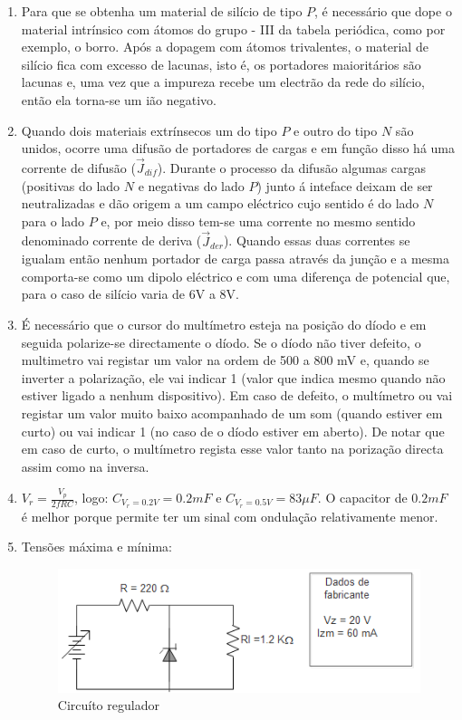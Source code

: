 \documentclass[11pt,a4paper,twoside]{report}
\begin{document}
\begin{enumerate}
\item Para que se obtenha um material de sil\'icio de tipo $P$, \'e necess\'ario que dope o material intr\'insico com \'atomos do grupo - III da tabela peri\'odica, como por exemplo, o borro. Ap\'os a dopagem com \'atomos trivalentes, o material de sil\'icio fica com excesso de lacunas, isto \'e, os portadores maiorit\'arios s\~ao lacunas e, uma vez que a impureza recebe um electr\~ao da rede do sil\'icio, ent\~ao ela torna-se um i\~ao negativo.

\item Quando dois materiais extr\'insecos um do tipo $P$ e outro do tipo $N$ s\~ao unidos, ocorre uma difus\~ao de portadores de cargas e em fun\c c\~ao disso h\'a uma corrente de difus\~ao ($\vec J_{dif}$). Durante o processo da difus\~ao algumas cargas (positivas do lado $N$ e negativas do lado $P$) junto \'a inteface deixam de ser neutralizadas e d\~ao origem a um campo el\'ectrico cujo sentido \'e do lado $N$ para o lado $P$ e, por meio disso tem-se uma corrente no mesmo sentido denominado corrente de deriva ($\vec J_{der}$). Quando essas duas correntes se igualam ent\~ao nenhum portador de carga passa atrav\'es da jun\c c\~ao e a mesma comporta-se como um dipolo el\'ectrico e com uma diferen\c ca de potencial que, para o caso de sil\'icio varia de 6V a 8V.  


\item \'E necess\'ario que o cursor do mult\'imetro esteja na posi\c c\~ao do d\'iodo e em seguida polarize-se directamente o d\'iodo. Se o d\'iodo n\~ao tiver defeito, o multimetro vai registar um valor na ordem de 500 a 800 mV e, quando se inverter a polariza\c c\~ao, ele vai indicar 1 (valor que indica mesmo quando n\~ao estiver ligado a nenhum dispositivo). Em caso de defeito, o mult\'imetro ou vai registar um valor muito baixo acompanhado de um som (quando estiver em curto) ou vai indicar 1 (no caso de o d\'iodo estiver em aberto). De notar que em caso de curto, o mult\'imetro regista esse valor tanto na poriza\c c\~ao directa assim como na inversa.

\item $V_r=\frac{V_p}{2fRC}$, logo: $C_{V_r=0.2V}=0.2mF$ e $C_{V_r=0.5V}=83\mu F$. O capacitor de $0.2mF$ \'e melhor porque permite ter um sinal com ondula\c c\~ao relativamente menor.



\item Tens\~oes m\'axima e m\'inima: 

\begin{figure}[H]
\centering
\includegraphics[scale=1]{cZener}
\caption{Circu\'ito regulador}
\label{f1}
\end{figure}


\end{enumerate}
\end{document}
